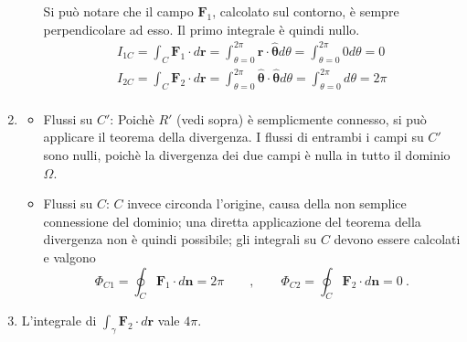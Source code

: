 \begin{enumerate}
\begin{itemize}
Si può notare che il campo $\bm{F}_1$, calcolato sul contorno, è sempre perpendicolare ad esso. Il primo integrale è quindi nullo.
\begin{equation}
\begin{aligned}
  I_{1C} = \int_C \bm{F}_1 \cdot d\bm{r} = \int_{\theta=0}^{2\pi} \bm{\hat{r}} \cdot \bm{\hat{\theta}} d\theta = 
           \int_{\theta=0}^{2\pi} 0 d\theta = 0 \\
  I_{2C} = \int_C \bm{F}_2 \cdot d\bm{r} = \int_{\theta=0}^{2\pi} \bm{\hat{\theta}} \cdot \bm{\hat{\theta}} d\theta = 
           \int_{\theta=0}^{2\pi} d\theta = 2\pi \\
\end{aligned}
\end{equation}	

\end{itemize}

\item
\begin{itemize}
\item{Flussi su $C'$}: Poichè $R'$ (vedi sopra) è semplicmente connesso, si può applicare il teorema
 della divergenza. I flussi di entrambi i campi su $C'$ sono nulli, poichè la divergenza dei due campi
 è nulla in tutto il dominio $\Omega$.

\item{Flussi su $C$}:  $C$ invece circonda l'origine, causa della non semplice connessione
 del dominio; una diretta applicazione del teorema della divergenza non è quindi possibile;
 gli integrali su $C$ devono essere calcolati e valgono
\begin{equation}
 \Phi_{C1} = \oint_C \bm{F}_1 \cdot d\bm{n} = 2 \pi \qquad , \qquad
 \Phi_{C2} = \oint_C \bm{F}_2 \cdot d\bm{n} = 0  \ .
\end{equation}

\end{itemize}

\item L'integrale di $\int_\gamma \bm{F}_2 \cdot d\bm{r}$ vale $4\pi$.

\begin{itemize}


\end{itemize}
\end{enumerate}
